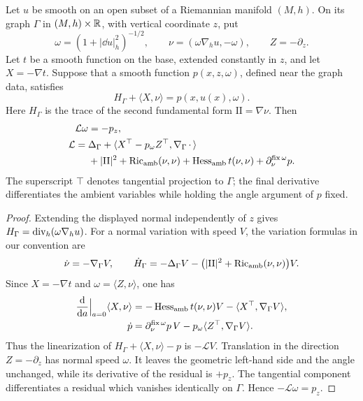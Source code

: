 \begin{lemma}\label{pre:angle}
Let $u$ be smooth on an open subset of a Riemannian manifold $(M,h)$.
On its graph $\Gamma$ in $(M,h)\times\mathbb R$, with vertical coordinate $z$,
put
\[
 \omega=(1+|\dd u|_h^2)^{-1/2},\qquad
 \nu=(\omega\nabla_hu,-\omega),\qquad Z=-\partial_z.
\]
Let $t$ be a smooth function on the base, extended constantly in $z$,
and let $X=-\nabla t$. Suppose that a smooth function $p(x,z,\omega)$,
defined near the graph data, satisfies
\[
 H_\Gamma+\langle X,\nu\rangle=p(x,u(x),\omega).
\]
Here $H_\Gamma$ is the trace of the second fundamental form
$\mathrm{II}=\nabla\nu$. Then
\begin{equation}\label{pre:angle-equation}
 \begin{split}
 \mathcal L\omega&=-p_z,\\
 \mathcal L={}&\Delta_\Gamma
  +\langle X^\top-p_\omega Z^\top,\nabla_\Gamma\,\cdot\,\rangle\\
 &+|\mathrm{II}|^2+\operatorname{Ric}_{\mathrm{amb}}(\nu,\nu)
       +\operatorname{Hess}_{\mathrm{amb}}t(\nu,\nu)
       +\partial_\nu^{\mathrm{fix}\,\omega}p.
 \end{split}
\end{equation}
The superscript $\top$ denotes tangential projection to $\Gamma$;
the final derivative differentiates the ambient variables while
holding the angle argument of $p$ fixed.
\end{lemma}

\begin{proof}
Extending the displayed normal independently of $z$ gives
$H_\Gamma=\operatorname{div}_h(\omega\nabla_hu)$. For a normal variation with speed
$V$, the variation formulas in our convention are
\[
 \dot\nu=-\nabla_\Gamma V,\qquad
 \dot H_\Gamma=-\Delta_\Gamma V
       -\bigl(|\mathrm{II}|^2+\operatorname{Ric}_{\mathrm{amb}}(\nu,\nu)\bigr)V.
\]
Since $X=-\nabla t$ and $\omega=\langle Z,\nu\rangle$, one has
\[
 \begin{split}
 \frac{\mathrm d}{\mathrm d a}\Big|_{a=0}\langle X,\nu\rangle
   &=-\operatorname{Hess}_{\mathrm{amb}}t(\nu,\nu)V
                          -\langle X^\top,\nabla_\Gamma V\rangle,\\
 \dot p&=\partial_\nu^{\mathrm{fix}\,\omega}p\,V
                       -p_\omega\langle Z^\top,\nabla_\Gamma V\rangle.
 \end{split}
\]
Thus the linearization of $H_\Gamma+\langle X,\nu\rangle-p$ is
$-\mathcal LV$. Translation in the direction $Z=-\partial_z$ has normal
speed $\omega$. It leaves the geometric left-hand side and the angle
unchanged, while its derivative of the residual is $+p_z$.
The tangential component differentiates a residual which vanishes
identically on $\Gamma$. Hence $-\mathcal L\omega=p_z$.
\end{proof}

